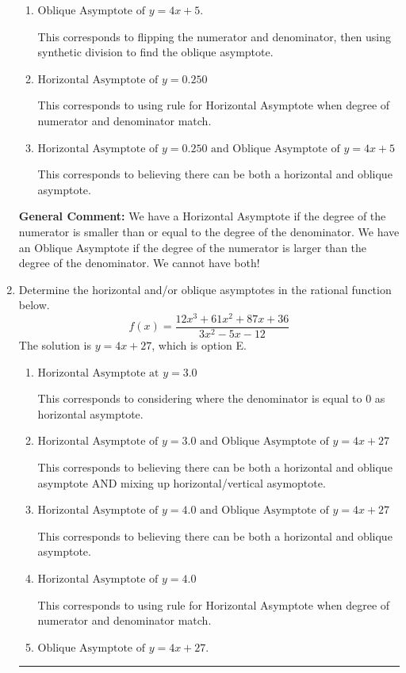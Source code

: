 \documentclass{extbook}[14pt]
\newcommand{\litem}[1]{\item #1

\rule{\textwidth}{0.4pt}}
\begin{document}
\begin{enumerate}
{\begin{enumerate}[label=\Alph*.]
This corresponds to considering where the denominator is equal to 0 as horizontal asymptote.
\item \( \text{Oblique Asymptote of } y = 4x + 5. \)

This corresponds to flipping the numerator and denominator, then using synthetic division to find the oblique asymptote.
\item \( \text{Horizontal Asymptote of } y = 0.250  \)

This corresponds to using rule for Horizontal Asymptote when degree of numerator and denominator match.
\item \( \text{Horizontal Asymptote of } y = 0.250 \text{ and Oblique Asymptote of } y = 4x + 5 \)

This corresponds to believing there can be both a horizontal and oblique asymptote.
\end{enumerate}

\textbf{General Comment:} We have a Horizontal Asymptote if the degree of the numerator is smaller than or equal to the degree of the denominator. We have an Oblique Asymptote if the degree of the numerator is larger than the degree of the denominator. We cannot have both!
}
\litem{
Determine the horizontal and/or oblique asymptotes in the rational function below.
\[ f(x) = \frac{12x^{3} +61 x^{2} +87 x + 36}{3x^{2} -5 x -12} \]The solution is \( y = 4x + 27 \), which is option E.\begin{enumerate}[label=\Alph*.]
\item \( \text{Horizontal Asymptote at } y = 3.0 \)

This corresponds to considering where the denominator is equal to 0 as horizontal asymptote.
\item \( \text{Horizontal Asymptote of } y = 3.0 \text{ and Oblique Asymptote of } y = 4x + 27 \)

This corresponds to believing there can be both a horizontal and oblique asymptote AND mixing up horizontal/vertical asymoptote.
\item \( \text{Horizontal Asymptote of } y = 4.0 \text{ and Oblique Asymptote of } y = 4x + 27 \)

This corresponds to believing there can be both a horizontal and oblique asymptote.
\item \( \text{Horizontal Asymptote of } y = 4.0  \)

This corresponds to using rule for Horizontal Asymptote when degree of numerator and denominator match.
\item \( \text{Oblique Asymptote of } y = 4x + 27. \)


\end{enumerate}}
\end{enumerate}
\end{document}
